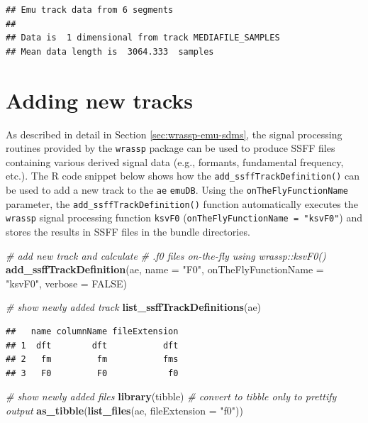 \documentclass[]{book}
\newenvironment{Shaded}{\begin{snugshade}}{\end{snugshade}}
\newcommand{\CommentTok}[1]{\textcolor[rgb]{0.56,0.35,0.01}{\textit{#1}}}
\newcommand{\DataTypeTok}[1]{\textcolor[rgb]{0.13,0.29,0.53}{#1}}
\newcommand{\KeywordTok}[1]{\textcolor[rgb]{0.13,0.29,0.53}{\textbf{#1}}}
\newcommand{\NormalTok}[1]{#1}
\newcommand{\OtherTok}[1]{\textcolor[rgb]{0.56,0.35,0.01}{#1}}
\newcommand{\StringTok}[1]{\textcolor[rgb]{0.31,0.60,0.02}{#1}}
\theoremstyle{definition}
\theoremstyle{definition}
\theoremstyle{definition}
\theoremstyle{remark}
\begin{document}
\begin{verbatim}
## Emu track data from 6 segments
## 
## Data is  1 dimensional from track MEDIAFILE_SAMPLES 
## Mean data length is  3064.333  samples
\end{verbatim}

\hypertarget{adding-new-tracks}{%
\section{Adding new tracks}\label{adding-new-tracks}}

As described in detail in Section \ref{sec:wrassp-emu-sdms}, the signal
processing routines provided by the \texttt{wrassp} package can be used
to produce SSFF files containing various derived signal data (e.g.,
formants, fundamental frequency, etc.). The R code snippet below shows
how the \texttt{add\_ssffTrackDefinition()} can be used to add a new
track to the \texttt{ae} \texttt{emuDB}. Using the
\texttt{onTheFlyFunctionName} parameter, the
\texttt{add\_ssffTrackDefinition()} function automatically executes the
\texttt{wrassp} signal processing function \texttt{ksvF0}
(\texttt{onTheFlyFunctionName\ =\ "ksvF0"}) and stores the results in
SSFF files in the bundle directories.

\begin{Shaded}
\begin{Highlighting}[]
\CommentTok{# add new track and calculate}
\CommentTok{# .f0 files on-the-fly using wrassp::ksvF0()}
\KeywordTok{add_ssffTrackDefinition}\NormalTok{(ae,}
                        \DataTypeTok{name =} \StringTok{"F0"}\NormalTok{,}
                        \DataTypeTok{onTheFlyFunctionName =} \StringTok{"ksvF0"}\NormalTok{,}
                        \DataTypeTok{verbose =} \OtherTok{FALSE}\NormalTok{)}

\CommentTok{# show newly added track}
\KeywordTok{list_ssffTrackDefinitions}\NormalTok{(ae)}
\end{Highlighting}
\end{Shaded}

\begin{verbatim}
##   name columnName fileExtension
## 1  dft        dft           dft
## 2   fm         fm           fms
## 3   F0         F0            f0
\end{verbatim}

\begin{Shaded}
\begin{Highlighting}[]
\CommentTok{# show newly added files}
\KeywordTok{library}\NormalTok{(tibble) }\CommentTok{# convert to tibble only to prettify output}
\KeywordTok{as_tibble}\NormalTok{(}\KeywordTok{list_files}\NormalTok{(ae, }\DataTypeTok{fileExtension =} \StringTok{"f0"}\NormalTok{))}
\end{Highlighting}
\end{Shaded}
\end{document}
